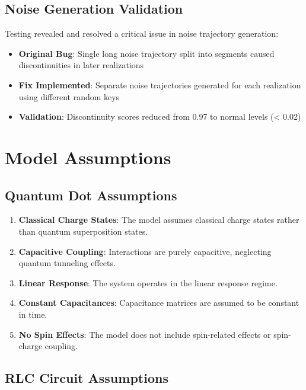 \documentclass{article}
\begin{document}
\subsection{Noise Generation Validation}

Testing revealed and resolved a critical issue in noise trajectory generation:

\begin{itemize}
\item \textbf{Original Bug}: Single long noise trajectory split into segments caused discontinuities in later realizations
\item \textbf{Fix Implemented}: Separate noise trajectories generated for each realization using different random keys
\item \textbf{Validation}: Discontinuity scores reduced from 0.97 to normal levels (< 0.02)
\end{itemize}

\section{Model Assumptions}

\subsection{Quantum Dot Assumptions}

\begin{enumerate}
\item \textbf{Classical Charge States}: The model assumes classical charge states rather than quantum superposition states.
\item \textbf{Capacitive Coupling}: Interactions are purely capacitive, neglecting quantum tunneling effects.
\item \textbf{Linear Response}: The system operates in the linear response regime.
\item \textbf{Constant Capacitances}: Capacitance matrices are assumed to be constant in time.
\item \textbf{No Spin Effects}: The model does not include spin-related effects or spin-charge coupling.
\end{enumerate}

\subsection{RLC Circuit Assumptions}
\end{document}
